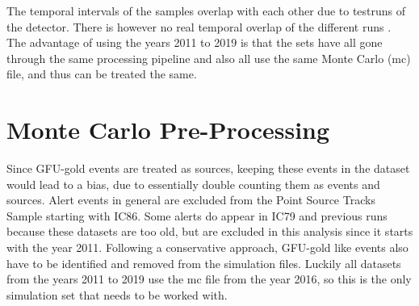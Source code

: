 The temporal intervals of the samples overlap with each other due to testruns of the detector.
There is however no real temporal overlap of the different runs \cite{private_com}.
The advantage of using the years 2011 to 2019 is that the sets have all gone through the same processing pipeline and also all use the same Monte Carlo (mc) file, and thus can be treated the same.

\section{Monte Carlo Pre-Processing}

Since GFU-gold events are treated as sources, keeping these events in the dataset would lead to a bias, due to essentially double counting them as events and sources.
Alert events in general are excluded from the Point Source Tracks Sample starting with IC86.
Some alerts do appear in IC79 and previous runs because these datasets are too old, but are excluded in this analysis since it starts with the year 2011.
Following a conservative approach, GFU-gold like events also have to be identified and removed from the simulation files.
Luckily all datasets from the years 2011 to 2019 use the mc file from the year 2016, so this is the only simulation set that needs to be worked with.

